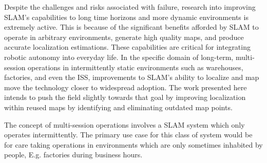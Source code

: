 
Despite the challenges and risks associated with failure, research into improving SLAM's capabilities to long time horizons and more dynamic environments is extremely active. This is because of the significant benefits afforded by SLAM to operate in arbitrary environments, generate high quality maps, and produce accurate localization estimations. These capabilities are critical for integrating robotic autonomy into everyday life. In the specific domain of long-term, multi-session operations in intermittently static environments such as warehouses, factories, and even the ISS, improvements to SLAM's ability to localize and map move the technology closer to widespread adoption.  The work presented here intends to push the field slightly towards that goal by improving localization within reused maps by identifying and eliminating outdated map points.


The concept of multi-session operations involves a SLAM system which only operates intermittently. The primary use case for this class of system would be for care taking operations in environments which are only sometimes inhabited by people, E.g. factories during business hours.


